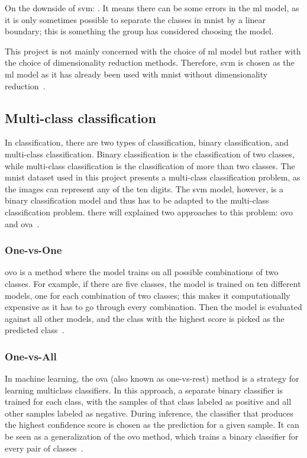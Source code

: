 On the downside of \gls{svm}: . It means there can be some errors in the \gls{ml} model, as it is only sometimes possible to separate the classes in \gls{mnist} by a linear boundary; this is something the group has considered choosing the model.

This project is not mainly concerned with the choice of \gls{ml} model but rather with the choice of dimensionality reduction methods. Therefore, \gls{svm} is chosen as the \gls{ml} model as it has already been used with \gls{mnist} without dimensionality reduction~\cite{lecun-mnist-database}.



\subsection{Multi-class classification}\label{subsec:multi-class}
In classification, there are two types of classification, binary classification, and multi-class classification. Binary classification is the classification of two classes, while multi-class classification is the classification of more than two classes. The \gls{mnist} dataset used in this project presents a multi-class classification problem, as the images can represent any of the ten digits. The \gls{svm} model, however, is a binary classification model and thus has to be adapted to the multi-class classification problem. there will explained two approaches to this problem: \gls{ovo} and \gls{ova}~\cite{james-statistical-learning1}.

\subsubsection{One-vs-One}\label{subsubsec:one-vs-one}
\gls{ovo} is a method where the model trains on all possible combinations of two classes. For example, if there are five classes, the model is trained on ten different models, one for each combination of two classes; this makes it computationally expensive as it has to go through every combination. Then the model is evaluated against all other models, and the class with the highest score is picked as the predicted class~\cite{james-statistical-learning1}.

\subsubsection{One-vs-All}\label{subsubsec:one-vs-all}
In machine learning, the \gls{ova} (also known as one-vs-rest) method is a strategy for learning multiclass classifiers. In this approach, a separate binary classifier is trained for each class, with the samples of that class labeled as positive and all other samples labeled as negative. During inference, the classifier that produces the highest confidence score is chosen as the prediction for a given sample. It can be seen as a generalization of the \gls{ovo} method, which trains a binary classifier for every pair of classes~\cite{james-statistical-learning1}.

